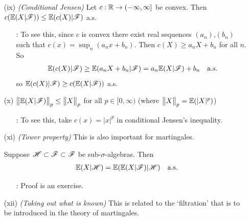 \documentclass[12pt,a4paper]{report}
\begin{document}
\begin{itemize}
\item[(ix)] \emph{(Conditional Jensen)} Let $c: \mathbb{R} \rightarrow (-\infty, \infty]$ be convex. Then $c(\mathbb{E}(X|\mathscr{F})) \leq \mathbb{E}( c(X) |\mathscr{F})$ a.s.
\begin{itemize}
\item[:] To see this, since $c$ is convex there exist real sequences $(a_n)$,$(b_n)$ such that $c(x) = \sup_n (a_n x +b_n)$. Then $c(X) \geq a_n X +b_n$ for all $n$. So
\begin{align*}
\mathbb{E}(c(X)|\mathscr{F}) \geq \mathbb{E}(a_n X + b_n|\mathscr{F}) = a_n \mathbb{E}(X|\mathscr{F}) + b_n \quad \text{a.s.}
\end{align*}
so $\mathbb{E}(c(X)|\mathscr{F}) \geq c(\mathbb{E}(X|\mathscr{F}))$ a.s.
\end{itemize}
\item[(x)] $\bigl\lVert\mathbb{E}(X|\mathscr{F})\bigr\rVert_{p}\leq \bigl\lVert X\bigr\rVert_{p}$ for all $p\in [0,\infty)$ (where $\bigl\lVert X\bigr\rVert_{p} = \mathbb{E}(|X|^p)$)
\begin{itemize}
\item[:] To see this, take $c(x) = |x|^p$ in conditional Jensen's inequality.
\end{itemize}
\item[(xi)] \emph{(Tower property)} This is also important for martingales.

Suppose $\mathscr{H} \subset \mathscr{F} \subset \mathscr{F}$ be sub-$\sigma$-algebras. Then
\begin{align*}
\mathbb{E}(X|\mathscr{H}) = \mathbb{E}(\mathbb{E}(X|\mathscr{F})|\mathscr{H}) \quad \text{a.s.}
\end{align*}
\begin{itemize}
\item[:] Proof is an exercise.
\end{itemize}
\item[(xii)] \emph{(Taking out what is known)} This is related to the `filtration' that is to be introduced in the theory of martingales.


\end{itemize}
\end{document}
